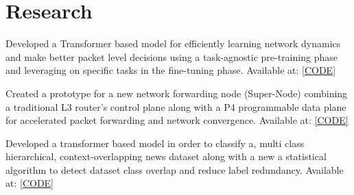 \documentclass[]{onepage}
\begin{document}
\begin{minipage}[t]{0.66\textwidth} 


\section{Research}

Developed a Transformer based model for efficiently learning network dynamics and make better packet level decisions using a task-agnostic pre-training phase and leveraging on specific tasks in the fine-tuning phase. Available at: {\href{https://github.com/Siddhant-Ray/Network-Traffic-Transformer}{[CODE]}}
\smallsectionsep

Created a prototype for a new network forwarding node (Super-Node) combining a traditional L3 router's control plane along with a P4 programmable data plane for accelerated packet forwarding and network convergence. Available at: {\href{https://github.com/Siddhant-Ray/FRR-P4-Super-Node-Prototype}{[CODE]}}
\smallsectionsep

Developed a transformer based model in order to classify a, multi class hierarchical, context-overlapping news dataset along with a new a statistical algorithm to detect dataset class overlap and reduce label redundancy. Available at: {\href{https://github.com/Siddhant-Ray/Attentive-neural-networks-for-news-classification}{[CODE]}}
\smallsectionsep




\end{minipage}
\end{document}
